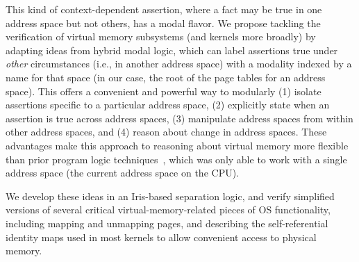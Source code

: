 This kind of context-dependent assertion, where a fact may be true in one address space but not others, has a modal flavor. We propose tackling the verification of virtual memory subsystems (and kernels more broadly) by adapting ideas from hybrid modal logic, which can label assertions true under \emph{other} circumstances (i.e., in another address space) with a modality indexed by a name for that space (in our case, the root of the page tables for an address space). This offers a convenient and powerful way to modularly (1) isolate assertions specific to a particular address space, (2) explicitly state when an assertion is true across address spaces, (3) manipulate address spaces from within other address spaces, and (4) reason about change in address spaces. These advantages make this approach to reasoning about virtual memory more flexible than prior program logic techniques~\cite{kolanski08vstte,kolanski09tphols}, which was only able to work with a single address space (the current address space on the CPU).

We develop these ideas in an Iris-based separation logic, and verify simplified versions of several critical virtual-memory-related pieces of OS functionality, including mapping and unmapping pages, and describing the self-referential identity maps used in most kernels to allow convenient access to physical memory.